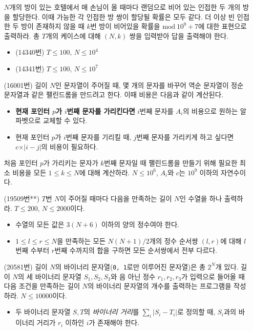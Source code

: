 \begin{problem}
    $N$개의 방이 있는 호텔에서 매 손님이 올 때마다 랜덤으로 비어 있는 인접한 두 개의 방을 할당한다. 이때 가능한 각 인접한 방 쌍이 할당될 확률은 모두 같다. 더 이상 빈 인접한 두 방이 존재하지 않을 때 $k$번 방이 비어있을 확률을 $\textrm{mod}~10^9+7$에 대한 표현으로 출력하라. 총 $T$개의 케이스에 대해 $(N, k)$ 쌍을 입력받아 답을 출력해야 한다.
    \begin{itemize}
        \item (14340번) $T \leq 100$, $N \leq 10^4$
        \item (14341번) $T \leq 100$, $N \leq 10^7$
    \end{itemize}
\end{problem}

\begin{problem}
    (16001번) 길이 $N$인 문자열이 주어질 때, 몇 개의 문자를 바꾸어 역순 문자열이 정순 문자열과 같은 팰린드롬을 만드려고 한다. 이때 비용은 다음과 같이 계산된다.
    \begin{itemize}
        \item \textbf{현재 포인터 $p$가 $i$번째 문자를 가리킨다면} $i$번째 문자를 $A_i$의 비용으로 원하는 알파벳으로 교체할 수 있다.
        \item 현재 포인터 $p$가 $i$번째 문자를 기리킬 때, $j$번째 문자를 가리키게 하고 싶다면 $c \times \vert{i-j}\vert$의 비용이 필요하다.
    \end{itemize}
    처음 포인터 $p$가 가리키는 문자가 $k$번째 문자일 때 팰린드롬을 만들기 위해 필요한 최소 비용을 모든 $1 \leq k \leq N$에 대해 계산하라. $N \leq 10^6$, $A_i$와 $c$는 $10^9$ 이하의 자연수이다.
\end{problem}

\begin{problem}
    (19509번**) $T$번 $N$이 주어질 때마다 다음을 만족하는 길이 $N$인 수열을 하나 출력하라. $T \leq 200$, $N \leq 2000$이다.
    \begin{itemize}
        \item 수열의 모든 값은 $3(N+6)$ 이하의 양의 정수여야 한다.
        \item $1 \leq l \leq r \leq N$을 만족하는 모든 $N(N+1)/2$개의 정수 순서쌍 $(l, r)$에 대해 $l$번째 수부터 $r$번째 수까지의 합을 구하면 모든 순서쌍에서 전부 다르다.
    \end{itemize}
\end{problem}

\begin{problem}
    (20581번) 길이 $N$의 바이너리 문자열(\texttt{0, 1}로만 이루어진 문자열)은 총 $2^N$개 있다. 길이 $N$의 세 바이너리 문자열 $S_1, S_2, S_3$와 음 아닌 정수 $r_1, r_2, r_3$가 입력으로 들어올 때 다음 조건을 만족하는 길이 $N$의 바이너리 문자열의 개수를 출력하는 프로그램을 작성하라. $N \leq 10000$이다.
    \begin{itemize}
        \item 두 바이너리 문자열 $S, T$의 \textit{바이너리 거리}를 $\sum_i {\vert S_i - T_i \vert}$로 정의할 때, $S_i$과의 바이너리 거리가 $r_i$ 이하인 $i$가 존재해야 한다.
    \end{itemize}
\end{problem}

